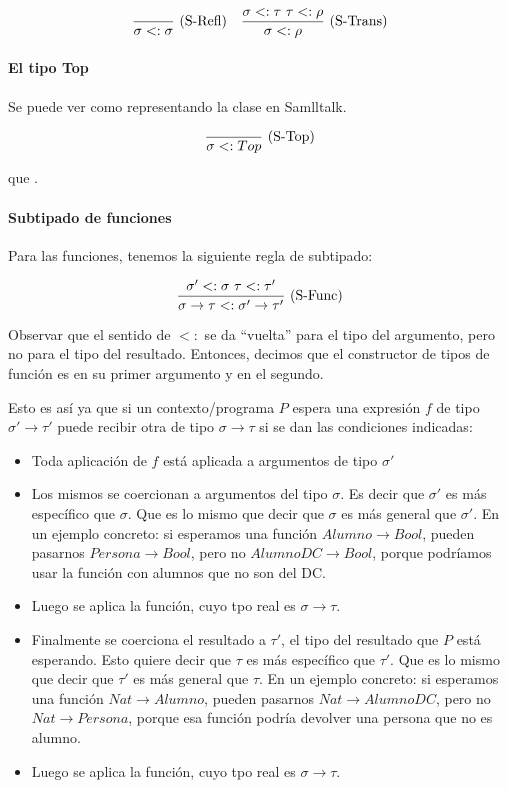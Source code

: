 \[\deriv{}{\subt{\sigma}{\sigma}}{S-Refl} \quad \deriv{\subt{\sigma}{\tau}\ \subt{\tau}{\rho}}{\subt{\sigma}{\rho}}{S-Trans}\]

\paragraph{El tipo Top}

Se puede ver como representando la clase  en Samlltalk.

\[\frac{}{\sigma <: Top}\ \text{(S-Top)}\]

 que .

\paragraph{Subtipado de funciones}

Para las funciones, tenemos la siguiente regla de subtipado:

\[\deriv{\subt{\sigma'}{\sigma}\ \subt{\tau}{\tau'}}{\subt{\sigma\to\tau}{\sigma'\to\tau'}}{S-Func}\]

Observar que el sentido de $<:$ se da ``vuelta'' para el tipo del argumento, pero no para el tipo del resultado.
Entonces, decimos que el constructor de tipos de función es  en su primer argumento y  en el segundo.

Esto es así ya que si un contexto/programa $P$ espera una expresión $f$ de tipo $\sigma'\to\tau'$ puede recibir otra de tipo $\sigma\to\tau$ si se dan las condiciones indicadas:

\begin{itemize}
  \item Toda aplicación de $f$ está aplicada a argumentos de tipo $\sigma'$
  \item Los mismos se coercionan a argumentos del tipo $\sigma$. Es decir que $\sigma'$ es más específico que $\sigma$. Que es lo mismo que decir que $\sigma$ es más general que $\sigma'$. En un ejemplo concreto: si esperamos una función $Alumno \to Bool$, pueden pasarnos $Persona \to Bool$, pero no $AlumnoDC \to Bool$, porque podríamos usar la función con alumnos que no son del DC.
  \item Luego se aplica la función, cuyo tpo real es $\sigma\to\tau$.
  \item Finalmente se coerciona el resultado a $\tau'$, el tipo del resultado que $P$ está esperando. Esto quiere decir que $\tau$ es más específico que $\tau'$. Que es lo mismo que decir que $\tau'$ es más general que $\tau$. En un ejemplo concreto: si esperamos una función $Nat \to Alumno$, pueden pasarnos $Nat \to AlumnoDC$, pero no $Nat \to Persona$, porque esa función podría devolver una persona que no es alumno.
  \item Luego se aplica la función, cuyo tpo real es $\sigma\to\tau$.
\end{itemize}

